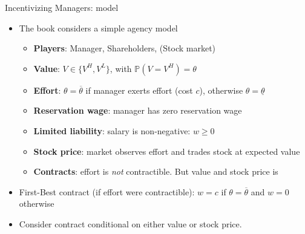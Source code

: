 \documentclass[english,10pt
,aspectratio=169
]{beamer}
\begin{document}
\begin{frame}{Incentivizing Managers: model}
	\begin{itemize}
		\item The book considers a simple agency model
		\begin{itemize}
			\item \textbf{Players}: Manager, Shareholders, (Stock market)
			\item \textbf{Value}: $V \in \{V^{H}, V^{L}\}$, with $\mathbb{P}(V=V^{H})=\theta$
			\item \textbf{Effort}: $\theta=\overline{\theta}$ if manager exerts effort (cost $c$), otherwise $\theta=\underline{\theta}$
			\item \textbf{Reservation wage}: manager has zero reservation wage
			\item \textbf{Limited liability}: salary is non-negative: $w \geq 0$
			\item \textbf{Stock price}: market observes effort and trades stock at expected value
			\item \textbf{Contracts}: effort is \textit{not} contractible. But value and stock price is
		\end{itemize}
		\item First-Best contract (if effort were contractible): $w=c$ if $\theta=\overline{\theta}$ and $w=0$ otherwise
		\item Consider contract conditional on either value or stock price.
	\end{itemize}
\end{frame}
\end{document}
